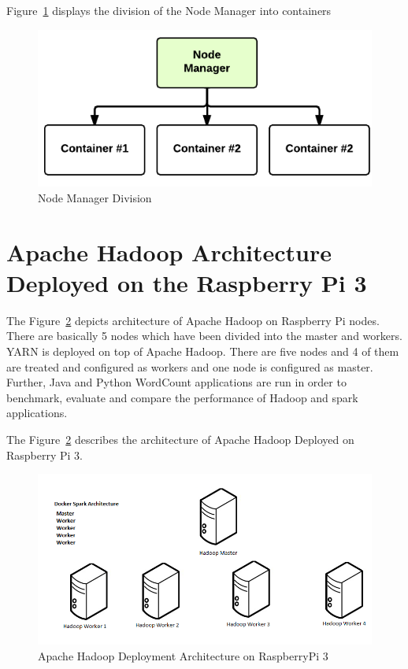Figure~\ref{s:archinode} displays the division of the Node Manager into 
containers

\begin{figure}[!ht]
\centering\includegraphics[width=\textwidth]{images/nodemanager.png}
\caption{Node 
Manager 
Division~\cite{hid-sp18-412-YARN_Hadoop_Internal}}\label{s:archinode}
\end{figure}

\section{Apache Hadoop Architecture Deployed on the Raspberry Pi 3}

The Figure~\ref{s:archihadoop} depicts 
architecture of Apache Hadoop on Raspberry Pi nodes. There are basically 5 nodes
which have been divided into the master and workers. YARN is deployed on top of 
Apache Hadoop. There are five nodes and 4 of them are treated and configured as 
workers and one node is configured as master. Further, Java and Python WordCount 
applications are run in order to benchmark, evaluate and compare the performance
of Hadoop and spark applications.

The Figure~\ref{s:archihadoop} describes the architecture of Apache 
Hadoop Deployed on Raspberry Pi 3.

\begin{figure}[!ht]
\centering\includegraphics[width=\textwidth]{images/RaspberryPiSpark.png}
\caption{Apache Hadoop Deployment Architecture on 
RaspberryPi 3}\label{s:archihadoop}
\end{figure}

